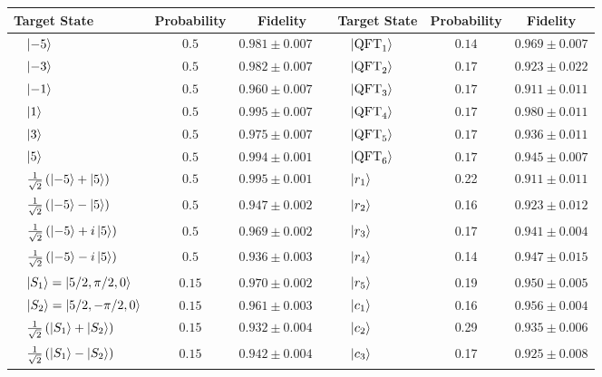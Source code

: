\begin{table}[tbh]
\centering\footnotesize
\begin{tabular}{lcc|lcc}
\toprule
Target State & Probability  & Fidelity & Target State & Probability  & Fidelity \\
\midrule
 $\quad\ket{-5}$ & $0.5$  & $0.981 \pm 0.007\quad$ & $\quad\ket{\operatorname{QFT}_1}$ & $0.14$ & $0.969\pm 0.007$\\
 $\quad\ket{-3}$ & $0.5$ & $0.982 \pm 0.007\quad$ & $\quad\ket{\operatorname{QFT}_2}$ & $0.17$ & $0.923\pm 0.022$ \\
 $\quad\ket{-1}$ & $0.5$ & $0.960 \pm 0.007\quad$ & $\quad\ket{\operatorname{QFT}_3}$ & $0.17$ & $0.911\pm 0.011$\\ 
 $\quad\ket{1}$ & $0.5$ & $0.995 \pm 0.007\quad$ & $\quad\ket{\operatorname{QFT}_4}$&$0.17$ &  $0.980\pm 0.011$ \\
 $\quad\ket{3}$ & $0.5$ & $0.975 \pm 0.007\quad$ & $\quad\ket{\operatorname{QFT}_5 }$& $0.17$& $0.936\pm 0.011$ \\
 $\quad\ket{5}$ & $0.5$ & $0.994 \pm 0.001\quad$ & $\quad\ket{\operatorname{QFT}_6} $& $0.17$ & $0.945\pm 0.007$ \\
 $\quad\frac{1}{\sqrt{2}}\left(\ket{-5}+\ket{5} \right)$ & $0.5$  & $0.995 \pm 0.001\quad$ &$\quad\ket{r_1}$ & 0.22& $0.911\pm0.011$\\
 $\quad\frac{1}{\sqrt{2}}\left(\ket{-5}-\ket{5}\right)$ & $0.5$ & $0.947 \pm 0.002\quad$ &$\quad\ket{r_2}$  & 0.16 & $0.923 \pm 0.012$\\
 $\quad\frac{1}{\sqrt{2}}\left(\ket{-5}+i\ket{5}\right)$ & $0.5$ & $0.969 \pm 0.002\quad$ &$\quad\ket{r_3}$  & 0.17 & $0.941 \pm 0.004$\\ 
  $\quad\frac{1}{\sqrt{2}}\left(\ket{-5}-i\ket{5}\right)$ & $0.5$ & $0.936 \pm 0.003\quad$&$\quad\ket{r_4} $& 0.14 &$0.947 \pm 0.015$  \\
 $\quad\ket{S_1}=\ket{5/2,\pi /2,0}$ & $0.15$ & $0.970 \pm 0.002\quad$ &$\quad\ket{r_5}$ & 0.19 & $0.950\pm0.005$  \\
 $\quad\ket{S_2}=\ket{5/2,-\pi /2,0}$ & $0.15$ & $0.961 \pm 0.003\quad$ &$\quad\ket{c_1}$ &0.16 & $0.956\pm0.004$ \\
 $\quad\frac{1}{\sqrt{2}}\left(\ket{S_1}+\ket{S_2}\right)$ & $0.15$ & $0.932 \pm 0.004\quad$&$\quad\ket{c_2}$ & 0.29 &$0.935 \pm 0.006$  \\
 $\quad\frac{1}{\sqrt{2}}\left(\ket{S_1}-\ket{S_2}\right)$ & $0.15$ & $0.942 \pm 0.004\quad$& $\quad\ket{c_3}$& 0.17 & $0.925\pm 0.008$ \\

\end{tabular}
\end{table}
